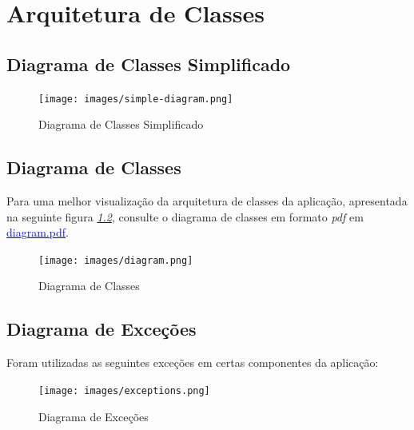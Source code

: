 \documentclass[a4paper,12pt]{scrreprt}
\begin{document}
\tableofcontents
\listoffigures
\pagebreak
{}




\chapter{Arquitetura de Classes}
\section{Diagrama de Classes Simplificado}
    \begin{figure}[!ht]
        \centering
        \texttt{[image: images/simple-diagram.png]}
        \caption{Diagrama de Classes Simplificado}
        \label{fig:diagrama-classes-simplificado}
    \end{figure}
\section{Diagrama de Classes}
    Para uma melhor visualização da arquitetura de classes da aplicação, apresentada
    na seguinte figura \textit{\ref{fig:diagrama-classes}}, consulte o diagrama de classes
    em formato \textit{pdf} em \href{diagram.pdf}{\textcolor{blue}{\underline{diagram.pdf}}}.
    \begin{figure}[!ht]
        \centering
        \texttt{[image: images/diagram.png]}
        \caption{Diagrama de Classes}
        \label{fig:diagrama-classes}
    \end{figure}
\section{Diagrama de Exceções}
    Foram utilizadas as seguintes exceções em certas componentes da aplicação:

    \begin{figure}[!ht]
        \centering
        \texttt{[image: images/exceptions.png]}
        \caption{Diagrama de Exceções}
        \label{fig:diagrama-excecoes}
    \end{figure}
\end{document}
